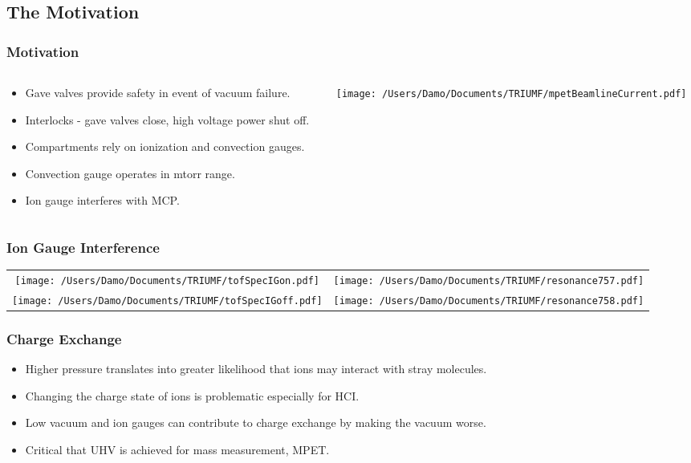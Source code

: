 \documentclass{beamer}
\begin{document}
\subsection{The Motivation}
\frame
{
  \frametitle{Motivation}
  \begin{columns}[T]
    \begin{column}{0.450\textwidth}
      \begin{itemize}
        \item<1> Gave valves provide safety in event of vacuum failure.
        \item<1> Interlocks - gave valves close, high voltage power shut off.
        \item<1> Compartments rely on ionization and convection gauges.
        \item<1> Convection gauge operates in mtorr range.
        \item<1> Ion gauge interferes with MCP.
      \end{itemize}
    \end{column}
    \begin{column}{0.550\textwidth}
    \texttt{[image: /Users/Damo/Documents/TRIUMF/mpetBeamlineCurrent.pdf]}
    \end{column}
  \end{columns}
}
\frame
{
  \frametitle{Ion Gauge Interference}
  \begin{table}[htdp]
  \centering
  \begin{tabular}{cc}
  \texttt{[image: /Users/Damo/Documents/TRIUMF/tofSpecIGon.pdf]}&\texttt{[image: /Users/Damo/Documents/TRIUMF/resonance757.pdf]}\\
  \texttt{[image: /Users/Damo/Documents/TRIUMF/tofSpecIGoff.pdf]}&\texttt{[image: /Users/Damo/Documents/TRIUMF/resonance758.pdf]} 
  \end{tabular}
  \end{table}%
}
\frame
{
  \frametitle{Charge Exchange}
  \begin{itemize}
  \item<1>Higher pressure translates into greater likelihood that ions may interact with stray molecules.
  \item<1>Changing the charge state of ions is problematic especially for HCI.
  \item<1>Low vacuum and ion gauges can contribute to charge exchange by making the vacuum worse.
  \item<1>Critical that UHV is achieved for mass measurement, MPET.
  \end{itemize}
}
\end{document}
